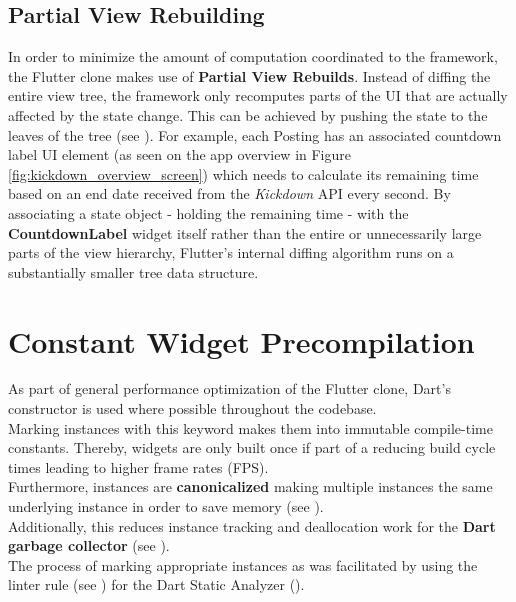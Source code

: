 \subsection{Partial View Rebuilding}
In order to minimize the amount of computation coordinated to the framework, the Flutter clone makes use of \textbf{Partial View Rebuilds}. 
Instead of diffing the entire view tree, the framework only recomputes parts of the UI that are actually affected by the state change. 
This can be achieved by pushing the state to the leaves of the tree (see \cite{StatefulWidgetPerformance2021}).
For example, each Posting has an associated countdown label UI element (as seen on the app overview in Figure \ref{fig:kickdown_overview_screen}) which needs to calculate its remaining time based on an end date received from the \textit{Kickdown} API every second.
By associating a state object - holding the remaining time - with the \textbf{CountdownLabel} widget itself rather than the entire or unnecessarily large parts of the view hierarchy, Flutter's internal diffing algorithm runs on a substantially smaller tree data structure.

\section{Constant Widget Precompilation} \label{section::constant_widget_precompilation}
As part of general performance optimization of the Flutter clone, Dart's  constructor is used where possible throughout the codebase.\\
Marking instances with this keyword makes them into immutable compile-time constants.
Thereby,  widgets are only built once if part of a  reducing build cycle times leading to higher frame rates (FPS).\\
Furthermore, instances are \textbf{canonicalized} making multiple instances the same underlying instance in order to save memory (see \cite{DartConstDocumentation}).\\
Additionally, this reduces instance tracking and deallocation work for the \textbf{Dart garbage collector} (see \cite{DartGarbageCollector2021}).\\
The process of marking appropriate instances as  was facilitated by using the  linter rule (see \cite{ConstLinterRule2021}) for the Dart Static Analyzer (\cite{DartCodeAnalysis2021}). 



